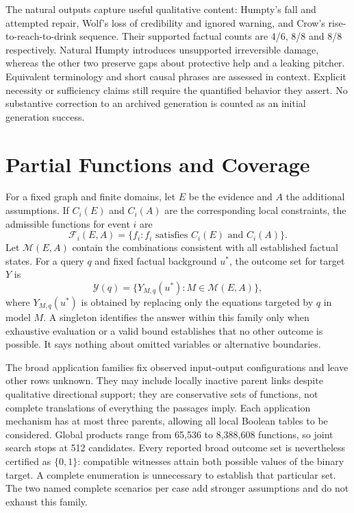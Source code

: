 \documentclass{svproc}
\begin{document}
The natural outputs capture useful qualitative content: Humpty's fall and attempted repair, Wolf's loss of credibility and ignored warning, and Crow's rise-to-reach-to-drink sequence. Their supported factual counts are 4/6, 8/8 and 8/8 respectively. Natural Humpty introduces unsupported irreversible damage, whereas the other two preserve gaps about protective help and a leaking pitcher. Equivalent terminology and short causal phrases are assessed in context. Explicit necessity or sufficiency claims still require the quantified behavior they assert. No substantive correction to an archived generation is counted as an initial generation success.

\clearpage
\section{Partial Functions and Coverage}\label{app:uncertainty}
For a fixed graph and finite domains, let $E$ be the evidence and $A$ the additional assumptions. If $C_i(E)$ and $C_i(A)$ are the corresponding local constraints, the admissible functions for event $i$ are
\begin{equation}\label{eq:family}
 \mathcal F_i(E,A)=\{f_i: f_i\text{ satisfies }C_i(E)\text{ and }C_i(A)\}.
\end{equation}
Let $\mathcal M(E,A)$ contain the combinations consistent with all established factual states. For a query $q$ and fixed factual background $u^*$, the outcome set for target $Y$ is
\begin{equation}\label{eq:outcomes}
 \mathcal Y(q)=\{Y_{M,q}(u^*): M\in\mathcal M(E,A)\},
\end{equation}
where $Y_{M,q}(u^*)$ is obtained by replacing only the equations targeted by $q$ in model $M$. A singleton identifies the answer within this family only when exhaustive evaluation or a valid bound establishes that no other outcome is possible. It says nothing about omitted variables or alternative boundaries.

The broad application families fix observed input-output configurations and leave other rows unknown. They may include locally inactive parent links despite qualitative directional support; they are conservative sets of functions, not complete translations of everything the passages imply. Each application mechanism has at most three parents, allowing all local Boolean tables to be considered. Global products range from 65,536 to 8,388,608 functions, so joint search stops at 512 candidates. Every reported broad outcome set is nevertheless certified as $\{0,1\}$: compatible witnesses attain both possible values of the binary target. A complete enumeration is unnecessary to establish that particular set. The two named complete scenarios per case add stronger assumptions and do not exhaust this family.
\end{document}

